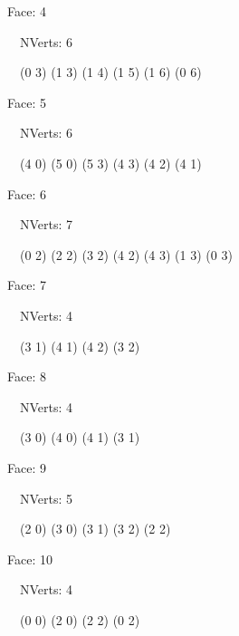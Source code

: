 \documentclass{article}
\begin{document}
    {\footnotesize

    Face: 4

    \   \    NVerts: 6

     \   \   (0 3) (1 3) (1 4) (1 5) (1 6) (0 6)}

    {\footnotesize

    Face: 5

    \   \    NVerts: 6

     \   \   (4 0) (5 0) (5 3) (4 3) (4 2) (4 1)}

    {\footnotesize

    Face: 6

    \   \    NVerts: 7

     \   \   (0 2) (2 2) (3 2) (4 2) (4 3) (1 3) (0 3)}

    {\footnotesize

    Face: 7

    \   \    NVerts: 4

     \   \   (3 1) (4 1) (4 2) (3 2)}

    {\footnotesize

    Face: 8

    \   \    NVerts: 4

     \   \   (3 0) (4 0) (4 1) (3 1)}

    {\footnotesize

    Face: 9

    \   \    NVerts: 5

     \   \   (2 0) (3 0) (3 1) (3 2) (2 2)}

    {\footnotesize

    Face: 10

    \   \    NVerts: 4

     \   \   (0 0) (2 0) (2 2) (0 2)}


     \newpage



    
\end{document}
